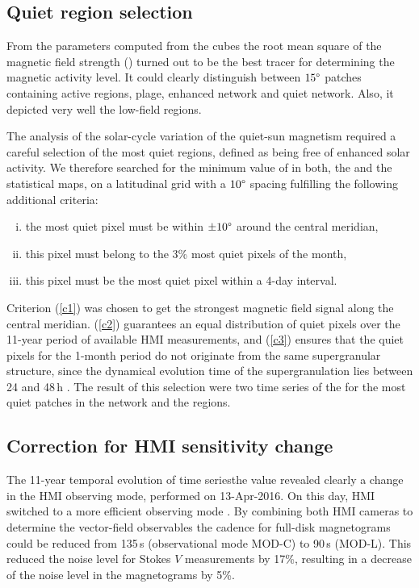 \documentclass{aa}
\begin{document}
\subsection{Quiet region selection}

From the parameters computed from the cubes the root mean square of the magnetic field strength (\brms{}) turned out to be the best tracer for determining the magnetic activity level. It could clearly distinguish between $15\degree$ patches containing active regions, plage, enhanced network and quiet network. Also, it depicted very well the low-field \IN{} regions.

The analysis of the solar-cycle variation of the quiet-sun magnetism required a careful selection of the most quiet regions, defined as being free of enhanced solar activity. We therefore searched for the minimum value of \brms{} in both, the \nw{} and the \inw{} statistical maps, on a latitudinal grid with a $10\degree$ spacing fulfilling the following additional criteria:
\begin{enumerate}[(i)]
	\item\label{c1} the most quiet pixel must be within $\pm10\degree$ around the central meridian,
	\item\label{c2}  this pixel must belong to the 3\% most quiet pixels of the month,
	\item\label{c3}  this pixel must be the most quiet pixel within a 4-day interval.
\end{enumerate}

Criterion (\ref{c1}) was chosen to get the strongest magnetic field signal along the central meridian. (\ref{c2}) guarantees an equal distribution of quiet pixels over the 11-year period of available HMI measurements, and (\ref{c3}) ensures that the quiet pixels for the 1-month period do not originate from the same supergranular structure, since the dynamical evolution time of the supergranulation lies between 24 and 48\,h \cite[]{2010LRSP....7....2R}. The result of this selection were two time series of the \brms{} for the most quiet patches in the network and the \IN{} regions.

\subsection{Correction for HMI sensitivity change}

The 11-year temporal evolution of \inw{} time series{the \brms{}} value revealed clearly a change in the HMI observing mode, performed on 13-Apr-2016. On this day, HMI switched to a more efficient observing mode \cite[see][]{2018SoPh..293...45H,2014SoPh..289.3483H,2016SoPh..291.1887C}. By combining both HMI cameras to determine the vector-field observables the cadence for full-disk magnetograms could be reduced from 135\,s (observational mode MOD-C) to 90\,s (MOD-L). This reduced the noise level for Stokes $V$ measurements by 17\%, resulting in a decrease of the noise level in the \los{} magnetograms by 5\%.
\end{document}
